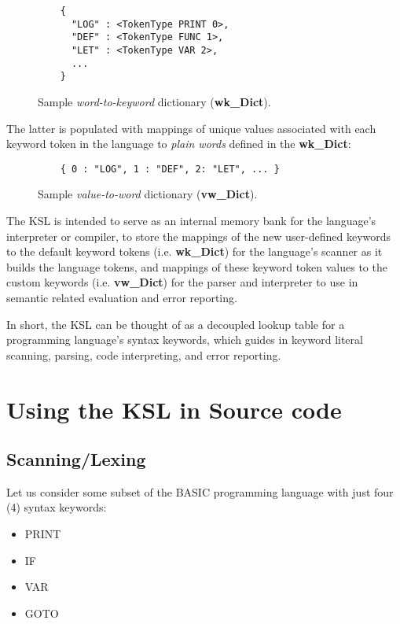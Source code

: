 \documentclass{article}
\begin{document}
\begin{figure}[ht]
  \centering
  \begin{verbatim}
    {
      "LOG" : <TokenType PRINT 0>,
      "DEF" : <TokenType FUNC 1>,
      "LET" : <TokenType VAR 2>,
      ...
    }
  \end{verbatim}
  \caption{Sample \textit{word-to-keyword} dictionary (\textbf{wk\_Dict}).}
  \label{fig:wk_Dict}
\end{figure}

The latter is populated with mappings of unique values associated with each keyword token in the language to \textit{plain words} defined in the \textbf{wk\_Dict}:

\begin{figure}[ht]
  \centering
  \begin{verbatim}
    { 0 : "LOG", 1 : "DEF", 2: "LET", ... }
  \end{verbatim}
  \caption{Sample \textit{value-to-word} dictionary (\textbf{vw\_Dict}).}
  \label{fig:vw_Dict}
\end{figure}

The KSL is intended to serve as an internal memory bank for the language's interpreter or compiler, to store the mappings of the new user-defined keywords to the default keyword tokens (i.e. \textbf{wk\_Dict}) for the language's scanner as it builds the language tokens, and mappings of these keyword token values to the custom keywords (i.e. \textbf{vw\_Dict}) for the parser and interpreter to use in semantic related evaluation and error reporting. 

In short, the KSL can be thought of as a decoupled lookup table for a programming language's syntax keywords, which guides in keyword literal scanning, parsing, code interpreting, and error reporting.

\section{Using the KSL in Source code}

\subsection{Scanning/Lexing}

Let us consider some subset of the BASIC \cite{BASIC} programming language with just four (4) syntax keywords:

\begin{itemize}
    \item PRINT
    \item IF
    \item VAR
    \item GOTO
\end{itemize}
\end{document}

